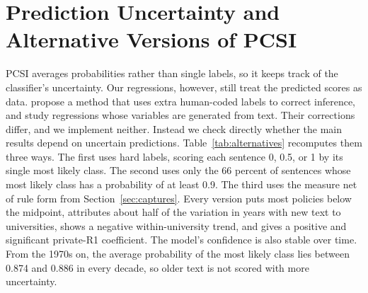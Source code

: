 \documentclass[11pt]{article}
\begin{document}



\section{Prediction Uncertainty and Alternative Versions of PCSI}\label{app:uncertainty}
\setcounter{table}{0}

PCSI averages probabilities rather than single labels, so it keeps track of the classifier's uncertainty. Our regressions, however, still treat the predicted scores as data. \citet{egami2023using} propose a method that uses extra human-coded labels to correct inference, and \citet{battaglia2024inference} study regressions whose variables are generated from text. Their corrections differ, and we implement neither. Instead we check directly whether the main results depend on uncertain predictions. Table~\ref{tab:alternatives} recomputes them three ways. The first uses hard labels, scoring each sentence 0, 0.5, or 1 by its single most likely class. The second uses only the 66 percent of sentences whose most likely class has a probability of at least 0.9. The third uses the measure net of rule form from Section~\ref{sec:captures}. Every version puts most policies below the midpoint, attributes about half of the variation in years with new text to universities, shows a negative within-university trend, and gives a positive and significant private-R1 coefficient. The model's confidence is also stable over time. From the 1970s on, the average probability of the most likely class lies between 0.874 and 0.886 in every decade, so older text is not scored with more uncertainty.


\end{document}
